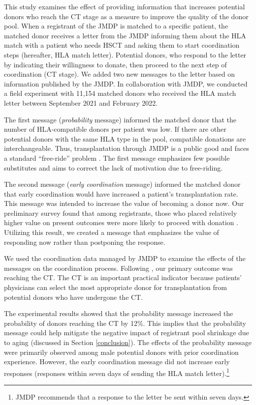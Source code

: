 \documentclass[12pt, a4paper]{article}
\begin{document}
This study examines the effect of providing information that increases potential donors who reach the CT stage as a measure to improve the quality of the donor pool. When a registrant of the JMDP is matched to a specific patient, the matched donor receives a letter from the JMDP informing them about the HLA match with a patient who needs HSCT and asking them to start coordination steps (hereafter, HLA match letter). Potential donors, who respond to the letter by indicating their willingness to donate, then proceed to the next step of coordination (CT stage). We added two new messages to the letter based on information published by the JMDP. In collaboration with JMDP, we conducted a field experiment with 11,154 matched donors who received the HLA match letter between September 2021 and February 2022.

The first message (\emph{probability} message) informed the matched donor that the number of HLA-compatible donors per patient was low. If there are other potential donors with the same HLA type in the pool, compatible donations are interchangeable. Thus, transplantation through JMDP is a public good and faces a standard ``free-ride'' problem \citep{Bergstrom2009}. The first message emphasizes few possible substitutes and aims to correct the lack of motivation due to free-riding.

The second message (\emph{early coordination} message) informed the matched donor that early coordination would have increased a patient's transplantation rate. This message was intended to increase the value of becoming a donor now. Our preliminary survey found that among registrants, those who placed relatively higher value on present outcomes were more likely to proceed with donation \citep{Ohtake2020}. Utilizing this result, we created a message that emphasizes the value of responding now rather than postponing the response.

We used the coordination data managed by JMDP to examine the effects of the messages on the coordination process. Following \citet{Haylock2024}, our primary outcome was reaching the CT. The CT is an important practical indicator because patients' physicians can select the most appropriate donor for transplantation from potential donors who have undergone the CT.

The experimental results showed that the probability message increased the probability of donors reaching the CT by 12\%. This implies that the probability message could help mitigate the negative impact of registrant pool shrinkage due to aging (discussed in Section \ref{conclusion}). The effects of the probability message were primarily observed among male potential donors with prior coordination experience. However, the early coordination message did not increase early responses (responses within seven days of sending the HLA match letter).\footnote{JMDP recommends that a response to the letter be sent within seven days.}
\end{document}
